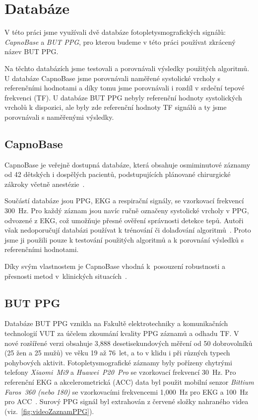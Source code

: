 \raggedbottom
\chapter{Databáze}
\label{chap:databaze}

V této práci jsme využívali dvě databáze fotopletysmografických signálů: \textit{CapnoBase} a \textit{\acl{BUT PPG}}, pro kterou budeme v této práci používat zkrácený název \acs{BUT PPG}.

Na těchto databázích jsme testovali a porovnávali výsledky použitých algoritmů.
U databáze CapnoBase jsme porovnávali naměřené systolické vrcholy s referenčními hodnotami a díky tomu jsme porovnávali i rozdíl v srdeční tepové frekvenci (\acs{TF}).
U databáze \acs{BUT PPG} nebyly referenční hodnoty systolických vrcholů k dispozici, ale byly zde referenční hodnoty \acs{TF} signálů a ty jsme porovnávali s naměřenými výsledky.

\section{CapnoBase}
\label{sec:capnobase}

CapnoBase je veřejně dostupná databáze, která obsahuje osmiminutové záznamy od 42 dětských i dospělých pacientů, podstupujících plánované chirurgické zákroky včetně anestézie~\cite{CapnoBase}.

Součástí databáze jsou \acs{PPG}, \acs{EKG} a respirační signály, se vzorkovací frekvencí 300~Hz.
Pro každý záznam jsou navíc ručně označeny systolické vrcholy v \acs{PPG}, odvozené z \acs{EKG}, což umožňuje přesné ověření správnosti detekce tepů.
Autoři však nedoporučují databázi používat k trénování či dolaďování algoritmů~\cite{CapnoBase}.
Proto jsme ji použili pouze k testování použitých algoritmů a k porovnání výsledků s referenčními hodnotami.

Díky svým vlastnostem je CapnoBase vhodná k~posouzení robustnosti a přesnosti metod v~klinických situacích~\cite{Karlen2013, Charlton2022}.

\section{\acs{BUT PPG}}
\label{sec:but_ppg}

Databáze \acs{BUT PPG} vznikla na Fakultě elektrotechniky a komunikačních technologií \acs{VUT} za účelem zkoumání kvality \acs{PPG} záznamů a odhadu \acs{TF}.
V nové rozšířené verzi obsahuje 3,888 desetisekundových měření od 50 dobrovolníků (25 žen a 25 mužů) ve věku 19 až 76~let, a to v klidu i při různých typech pohybových aktivit.
Fotopletysmografické záznamy byly pořízeny chytrými telefony \textit{Xiaomi~Mi9} a \textit{Huawei~P20~Pro} se vzorkovací frekvencí 30~Hz.
Pro referenční \acs{EKG} a akcelerometrická (\acs{ACC}) data byl použit mobilní senzor \textit{Bittium Faros~360 (nebo 180)} se vzorkovacími frekvencemi 1,000~Hz pro \acs{EKG} a 100~Hz pro \acs{ACC}~\cite{BUT_PPG}.
Surový \acs{PPG} signál byl extrahován z červené složky nahraného videa (viz.~\ref{fig:videoZaznamPPG}).

